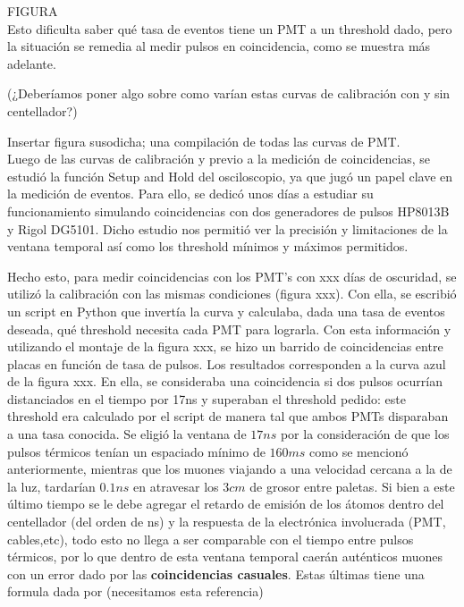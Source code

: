 \documentclass[12pt,a4paper]{article}
\numberwithin{equation}{section}
\begin{document}
FIGURA\\

Esto dificulta saber qué tasa de eventos tiene un PMT a un threshold dado, pero la situación se remedia al medir pulsos en coincidencia, como se muestra más adelante.

(¿Deberíamos poner algo sobre como varían estas curvas de calibración con y sin centellador?)

Insertar figura susodicha; una compilación de todas las curvas de PMT.\\


Luego de las curvas de calibración y previo a la medición de coincidencias, se estudió la función Setup and Hold del osciloscopio, ya que jugó un papel clave en la medición de eventos. Para ello, se dedicó unos días a estudiar su funcionamiento simulando coincidencias con dos generadores de pulsos HP8013B y Rigol DG5101. Dicho estudio nos permitió ver la precisión y limitaciones de la ventana temporal así como los threshold mínimos y máximos permitidos.

Hecho esto, para medir coincidencias con los PMT's con xxx días de oscuridad, se utilizó la calibración con las mismas condiciones (figura xxx). Con ella, se escribió un script en Python que invertía la curva y calculaba, dada una tasa de eventos deseada, qué threshold necesita cada PMT para lograrla. Con esta información y utilizando el montaje de la figura xxx, se hizo un barrido de coincidencias entre placas en función de tasa de pulsos. Los resultados corresponden a la curva azul de la figura xxx. En ella, se consideraba una coincidencia si dos pulsos ocurrían distanciados en el tiempo por 17ns y superaban el threshold pedido: este threshold era calculado por el script de manera tal que ambos PMTs disparaban a una tasa conocida. Se eligió la ventana de $ 17 ns $ por la consideración de que los pulsos térmicos tenían un espaciado mínimo de $ 160 ms $ como se mencionó anteriormente, mientras que los muones viajando a una velocidad cercana a la de la luz, tardarían $ 0.1 ns $ en atravesar los $ 3 cm $ de grosor entre paletas. Si bien a este último tiempo se le debe agregar el retardo de emisión de los átomos dentro del centellador (del orden de ns) y la respuesta de la electrónica involucrada (PMT, cables,etc), todo esto no llega a ser comparable con el tiempo entre pulsos térmicos, por lo que dentro de esta ventana temporal caerán auténticos muones con un error dado por las \textbf{coincidencias casuales}. Estas últimas tiene una formula dada por\cite{coincidencias_casuales} (necesitamos esta referencia)
 
\end{document}
